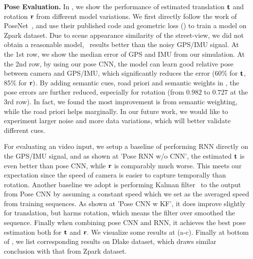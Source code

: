 \textbf{Pose Evaluation.}
In , we show the performance of estimated translation ${\mathbf t}$ and rotation ${\mathbf r}$ from different model variations. 
We first directly follow the work of PoseNet~\cite{Kendall_2015_ICCV,kendall2017geometric}, and use their published code and geometric loss () to train a model on Zpark dataset. 
Due to scene appearance similarity of the street-view, we did not obtain a reasonable model, \ie~results better than the noisy GPS/IMU signal.
At the 1st row, we show the median error of GPS and IMU from our simulation. 
At the 2nd row, by using our pose CNN, the model can learn good relative pose between camera and GPS/IMU, which significantly reduces the error (60$\%$ for ${\mathbf t}$, 85$\%$ for ${\mathbf r})$. 
By adding semantic cues, \ie road priori and semantic weights in , the pose errors are further reduced, especially for rotation (from $0.982$ to $0.727$ at the 3rd row). In fact, we found the most improvement is from semantic weighting, while the road priori helps marginally. In our future work, we would like to experiment larger noise and more data variations, which will better validate different cues.

For evaluating an video input, we setup a baseline of performing RNN directly on the GPS/IMU signal, and as shown at 'Pose RNN w/o CNN', the estimated ${\mathbf t}$ is even better than pose CNN, while ${\mathbf r}$ is comparably much worse. This meets our expectation since the speed of camera is easier to capture temporally than rotation. Another baseline we adopt is performing Kalman filter~\cite{kalman1960new} to the output from Pose CNN by assuming a constant speed which we set as the averaged speed from training sequences. As shown at 'Pose CNN w KF', it does improve slightly for translation, but harms rotation, which means the filter over smoothed the sequence. Finally when combining pose CNN and RNN, it achieves the best pose estimation both for ${\mathbf t}$ and ${\mathbf r}$. We visualize some results at (a-c).
Finally at bottom of , we list corresponding results on Dlake dataset, which draws similar conclusion with that from Zpark dataset.


